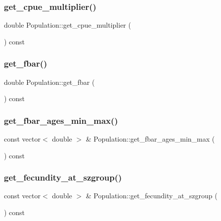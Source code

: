 \subsubsection{\texorpdfstring{get\_cpue\_multiplier()}{get\_cpue\_multiplier()}}
{\footnotesize\ttfamily double Population\+::get\+\_\+cpue\+\_\+multiplier (\begin{DoxyParamCaption}{ }\end{DoxyParamCaption}) const}

\mbox{\label{class_population_a22059e8a5b9aafc8d20b4e1b79a9ea66}} 
\subsubsection{\texorpdfstring{get\_fbar()}{get\_fbar()}}
{\footnotesize\ttfamily double Population\+::get\+\_\+fbar (\begin{DoxyParamCaption}{ }\end{DoxyParamCaption}) const}

\mbox{\label{class_population_a814f822599b32e19568a3e1f2b98bb94}} 
\subsubsection{\texorpdfstring{get\_fbar\_ages\_min\_max()}{get\_fbar\_ages\_min\_max()}}
{\footnotesize\ttfamily const vector$<$ double $>$ \& Population\+::get\+\_\+fbar\+\_\+ages\+\_\+min\+\_\+max (\begin{DoxyParamCaption}{ }\end{DoxyParamCaption}) const}

\mbox{\label{class_population_aa6b1d67e670b56b7f303ee11a204ecc7}} 
\subsubsection{\texorpdfstring{get\_fecundity\_at\_szgroup()}{get\_fecundity\_at\_szgroup()}}
{\footnotesize\ttfamily const vector$<$ double $>$ \& Population\+::get\+\_\+fecundity\+\_\+at\+\_\+szgroup (\begin{DoxyParamCaption}{ }\end{DoxyParamCaption}) const}

